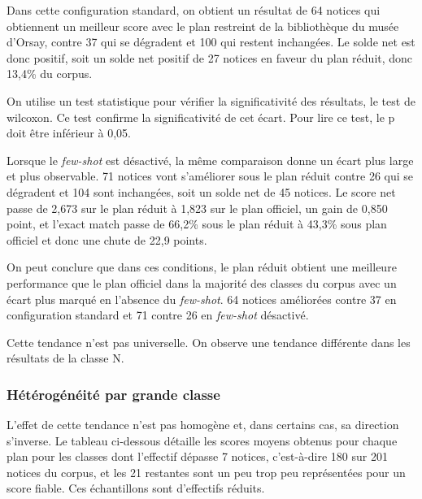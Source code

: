 Dans cette configuration standard, on obtient un résultat de 64 notices qui obtiennent un meilleur score avec le plan restreint de la bibliothèque du musée d'Orsay, contre 37 qui se dégradent et 100 qui restent inchangées. Le solde net est donc positif, soit un solde net positif de 27 notices en faveur du plan réduit, donc 13,4\% du corpus.

On utilise un test statistique pour vérifier la significativité des résultats, le test de \gls{wilcoxon}. 
Ce test confirme la significativité de cet écart. Pour lire ce test, le p doit être inférieur à 0,05.


Lorsque le \textit{few-shot} est désactivé, la même comparaison donne un écart plus large et plus observable. 71 notices vont s'améliorer sous le plan réduit contre 26 qui se dégradent et 104 sont inchangées, soit un solde net de 45 notices.
Le score net passe de 2,673 sur le plan réduit à 1,823 sur le plan officiel, un gain de 0,850 point, et l'exact match passe de 66,2\% sous le plan réduit à 43,3\% sous plan officiel et donc une chute de 22,9 points.

On peut conclure que dans ces conditions, le plan réduit obtient une meilleure performance que le plan officiel dans la majorité des classes du corpus avec un écart plus marqué en l'absence du \textit{few-shot}. 64 notices améliorées contre 37 en configuration standard et 71 contre 26 en \textit{few-shot} désactivé.

Cette tendance n'est pas universelle. On observe une tendance différente dans les résultats de la classe N.

\subsubsection*{Hétérogénéité par grande classe}

L'effet de cette tendance n'est pas homogène et, dans certains cas, sa direction s'inverse.
Le tableau ci-dessous détaille les scores moyens obtenus pour chaque plan pour les classes dont l'effectif dépasse 7 notices, c'est-à-dire 180 sur 201 notices du corpus, et les 21 restantes sont un peu trop peu représentées pour un score fiable. Ces échantillons sont d'effectifs réduits.


